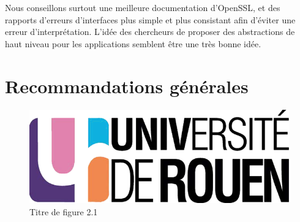 			Nous conseillons surtout une meilleure documentation d'OpenSSL, et des rapports d'erreurs d'interfaces plus simple et plus consistant afin d'éviter une erreur d'interprétation. L'idée des chercheurs de proposer des abstractions de haut niveau pour les applications semblent être une très bonne idée.
		
		


\section{Recommandations générales}




\begin{figure}[H]
	\centering
	\includegraphics[scale=0.2]{images/logo_univ.png}
	\caption{Titre de figure 2.1}
	\label{fig21}
\end{figure}